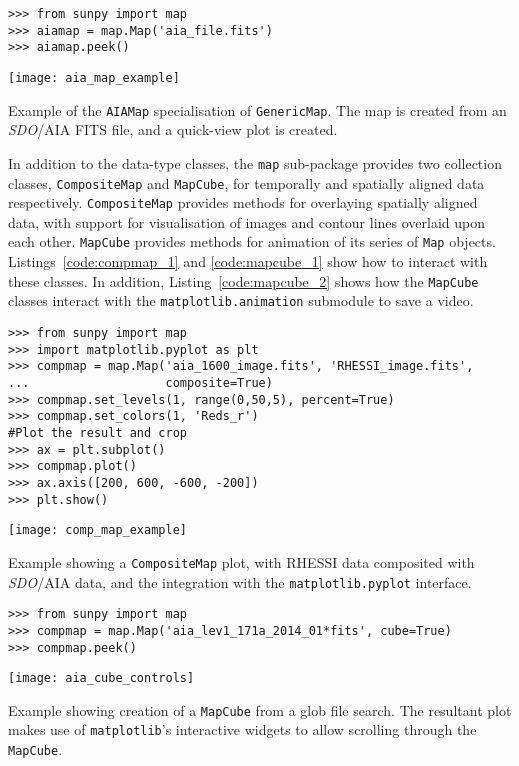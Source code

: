 \begin{listing}[H]
\begin{verbatim}
>>> from sunpy import map
>>> aiamap = map.Map('aia_file.fits')
>>> aiamap.peek()
\end{verbatim}
\begin{center}
\texttt{[image: aia\_map\_example]}
\end{center}
\caption{Example of the \texttt{AIAMap} specialisation of 
\texttt{GenericMap}. The map is created from an \textit{SDO}/AIA FITS file,
and a quick-view plot is created.}
\label{code:aia_1}
\end{listing}

In addition to the data-type classes, the \texttt{map} sub-package provides two 
collection classes, \texttt{CompositeMap} and \texttt{MapCube}, for 
temporally and spatially aligned data respectively.
\texttt{CompositeMap} provides methods for overlaying spatially aligned 
data, with support for visualisation of images and contour lines overlaid 
upon each other.
\texttt{MapCube} 
provides methods for animation of its series of \texttt{Map} objects. 
Listings~\ref{code:compmap_1} and \ref{code:mapcube_1} show how to interact 
with these classes.
In addition, Listing~\ref{code:mapcube_2} shows how the \texttt{MapCube} 
classes interact with the \texttt{matplotlib.animation} submodule to save a 
video.

\begin{listing}[H]
\begin{verbatim}
>>> from sunpy import map
>>> import matplotlib.pyplot as plt
>>> compmap = map.Map('aia_1600_image.fits', 'RHESSI_image.fits', 
...                   composite=True)
>>> compmap.set_levels(1, range(0,50,5), percent=True)
>>> compmap.set_colors(1, 'Reds_r')
#Plot the result and crop
>>> ax = plt.subplot()
>>> compmap.plot()
>>> ax.axis([200, 600, -600, -200])
>>> plt.show()
\end{verbatim}
\begin{center}
\texttt{[image: comp\_map\_example]}
\end{center}
\caption{Example showing a \texttt{CompositeMap} plot, with RHESSI data composited
with \textit{SDO}/AIA data, and the integration with the \texttt{matplotlib.pyplot} interface.}
\label{code:compmap_1}
\end{listing}

\begin{listing}[H]
\begin{verbatim}
>>> from sunpy import map
>>> compmap = map.Map('aia_lev1_171a_2014_01*fits', cube=True)
>>> compmap.peek()
\end{verbatim}
\begin{center}
\texttt{[image: aia\_cube\_controls]}
\end{center}
\caption{Example showing creation of a \texttt{MapCube} from a glob file search. The 
resultant plot makes use of \texttt{matplotlib}'s interactive widgets to allow scrolling 
through the \texttt{MapCube}.}
\label{code:mapcube_1}
\end{listing}

